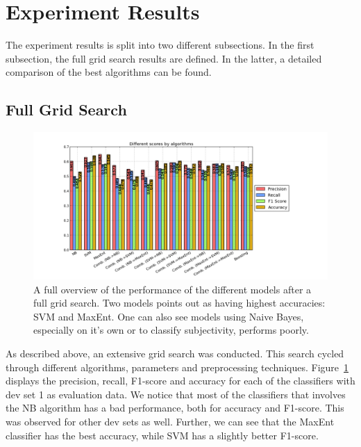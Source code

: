 \section{Experiment Results}
\label{sec:results}

The experiment results is split into two different subsections. In the first subsection, the full grid search results are defined. In the latter, a detailed comparison of the best algorithms can be found.

\subsection{Full Grid Search}

\begin{figure}
 \begin{center}
     \includegraphics[width=\linewidth]{../img/plots/grid/full.png}
 \end{center}
 \caption[Results overview across models]{A full overview of the performance of the different models after a full grid search. Two models points out as having highest accuracies: SVM and MaxEnt. One can also see models using Naive Bayes, especially on it's own or to classify subjectivity, performs poorly.}
 \label{fig:results_full}
\end{figure}

As described above, an extensive grid search was conducted. This search cycled through different algorithms, parameters and preprocessing techniques. Figure~\ref{fig:results_full} displays the precision, recall, F1-score and accuracy for each of the classifiers with dev set 1 as evaluation data. We notice that most of the classifiers that involves the NB algorithm has a bad performance, both for accuracy and F1-score. This was observed for other dev sets as well. Further, we can see that the MaxEnt classifier has the best accuracy, while SVM has a slightly better F1-score.


